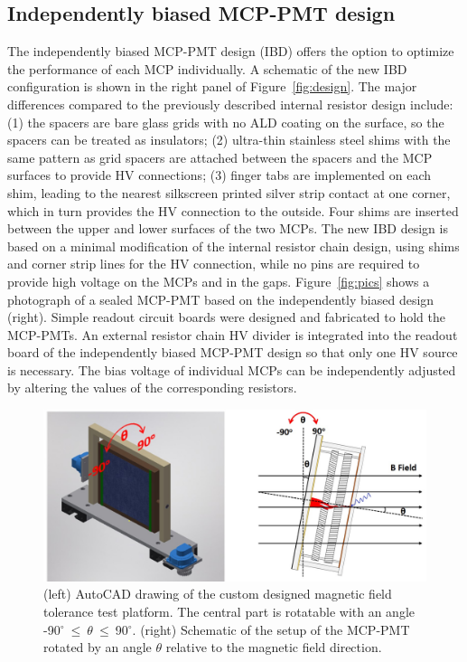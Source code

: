 \documentclass[preprint,5p]{elsarticle}
\begin{document}
\subsection{Independently biased MCP-PMT design} \label{sec_design}
The independently biased MCP-PMT design (IBD) offers the option to optimize the
performance of each MCP individually.
 A schematic of the new IBD configuration is shown in the right panel 
of Figure~\ref{fig:design}. The major differences compared to the 
previously described internal resistor design include: (1) 
the spacers are bare glass grids with no ALD coating on the surface, so the 
spacers can be treated as insulators; (2) ultra-thin stainless steel shims with 
the same pattern as grid spacers are attached between the spacers and the MCP 
surfaces to provide HV connections; (3) finger tabs are implemented on each shim, leading 
to the nearest silkscreen printed silver strip contact at one corner, which in turn
provides the HV connection to the outside.
Four shims are inserted between the upper and lower surfaces of the two MCPs.
The new IBD design is based on a minimal modification of the internal resistor chain design, using 
shims and corner strip lines for the HV connection, while no pins are required to provide 
high voltage on the MCPs and in the gaps. Figure~\ref{fig:pics} shows a  
photograph of a sealed MCP-PMT based on the independently biased design (right). 
Simple readout circuit boards were designed and fabricated to hold the MCP-PMTs. An external resistor 
chain HV divider is integrated into the readout board of the independently biased 
MCP-PMT design so that only one HV source is necessary. The 
bias voltage of individual MCPs can be independently adjusted by altering the values of the 
corresponding resistors. 

\begin{figure}[tbp]
\centering \includegraphics[scale=0.6]{fig/Figure3.jpg}
\caption{(left) AutoCAD drawing of the custom designed magnetic field tolerance 
   test platform. The central part is rotatable with an angle 
   -90$^{\circ}~\leq~\theta~\leq~$90$^{\circ}$.  (right) Schematic of the 
  setup of the MCP-PMT rotated by an angle $\theta$ relative to the 
   magnetic field direction. } \label{fig:theta}
\end{figure}
\end{document}
